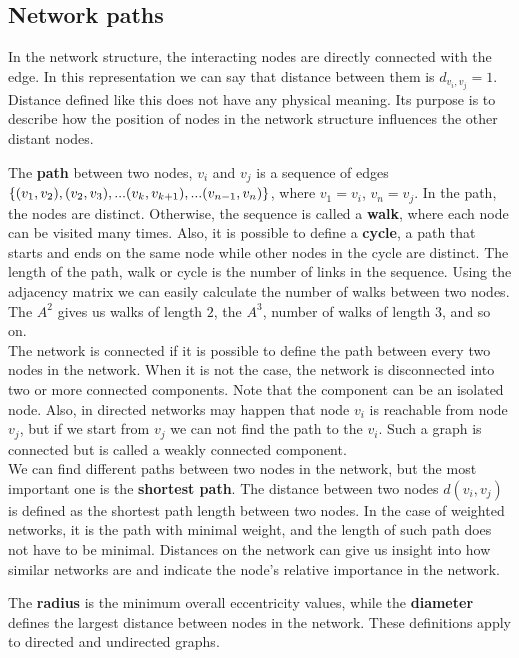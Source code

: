 \subsection{Network paths}
In the network structure, the interacting nodes are directly connected with the edge. In this representation we can say that distance between them is $d_{v_i, v_j}=1$. Distance defined like this does not have any physical meaning. Its purpose is to describe how the position of nodes in the network structure influences the other distant nodes. 

The \textbf{path} between two nodes, $v_i$ and $v_j$ is a sequence of edges $\{(v_1, v_2),  (v_2, v_3), ...(v_k, v_{k+1})\\,... (v_{n-1}, v_n)\}$, where $v_1=v_i$, $v_n=v_j$. In the path, the nodes are distinct. Otherwise, the sequence is called a \textbf{walk}, where each node can be visited many times. Also, it is possible to define a \textbf{cycle}, a path that starts and ends on the same node while other nodes in the cycle are distinct. The length of the path, walk or cycle is the number of links in the sequence. Using the adjacency matrix we can easily calculate the number of walks between two nodes. The $A^2$ gives us walks of length $2$, the $A^3$, number of walks of length 3, and so on. \\

The network is connected if it is possible to define the path between every two nodes in the network. When it is not the case, the network is disconnected into two or more connected components. Note that the component can be an isolated node. Also, in directed networks may happen that node $v_i$ is reachable from node $v_j$, but if we start from $v_j$ we can not find the path to the $v_i$. Such a graph is connected but is called a weakly connected component. \\

We can find different paths between two nodes in the network, but the most important one is the \textbf{shortest path}. The distance between two nodes $d(v_i, v_j)$ is defined as the shortest path length between two nodes. 
In the case of weighted networks, it is the path with minimal weight, and the length of such path does not have to be minimal. Distances on the network can give us insight into how similar networks are and indicate the node's relative importance in the network. 

The \textbf{radius} is the minimum overall eccentricity values, while the \textbf{diameter} defines the largest distance between nodes in the network. These definitions apply to directed and undirected graphs. 


